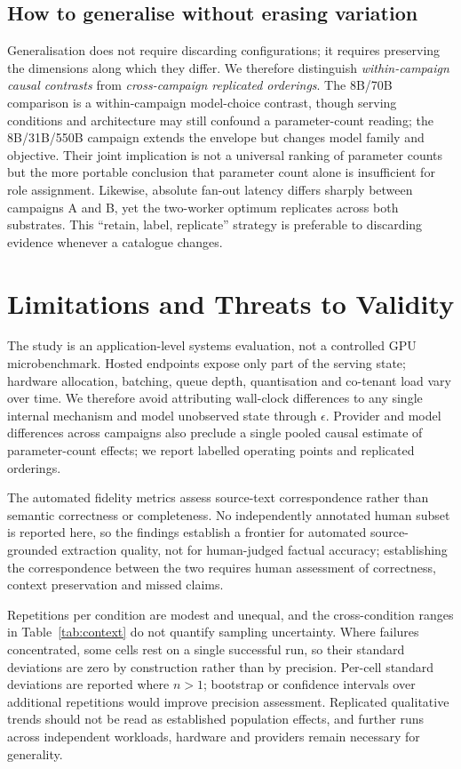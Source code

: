 \documentclass[conference]{IEEEtran}
\begin{document}
\subsection{How to generalise without erasing variation}
Generalisation does not require discarding configurations; it requires preserving the dimensions along which they differ. We therefore distinguish \emph{within-campaign causal contrasts} from \emph{cross-campaign replicated orderings}. The 8B/70B comparison is a within-campaign model-choice contrast, though serving conditions and architecture may still confound a parameter-count reading; the 8B/31B/550B campaign extends the envelope but changes model family and objective. Their joint implication is not a universal ranking of parameter counts but the more portable conclusion that parameter count alone is insufficient for role assignment. Likewise, absolute fan-out latency differs sharply between campaigns A and B, yet the two-worker optimum replicates across both substrates. This ``retain, label, replicate'' strategy is preferable to discarding evidence whenever a catalogue changes.

\section{Limitations and Threats to Validity}
The study is an application-level systems evaluation, not a controlled GPU microbenchmark. Hosted endpoints expose only part of the serving state; hardware allocation, batching, queue depth, quantisation and co-tenant load vary over time. We therefore avoid attributing wall-clock differences to any single internal mechanism and model unobserved state through $\epsilon$. Provider and model differences across campaigns also preclude a single pooled causal estimate of parameter-count effects; we report labelled operating points and replicated orderings.

The automated fidelity metrics assess source-text correspondence rather than semantic correctness or completeness. No independently annotated human subset is reported here, so the findings establish a frontier for automated source-grounded extraction quality, not for human-judged factual accuracy; establishing the correspondence between the two requires human assessment of correctness, context preservation and missed claims.

Repetitions per condition are modest and unequal, and the cross-condition ranges in Table~\ref{tab:context} do not quantify sampling uncertainty. Where failures concentrated, some cells rest on a single successful run, so their standard deviations are zero by construction rather than by precision. Per-cell standard deviations are reported where $n>1$; bootstrap or confidence intervals over additional repetitions would improve precision assessment. Replicated qualitative trends should not be read as established population effects, and further runs across independent workloads, hardware and providers remain necessary for generality.
\end{document}
